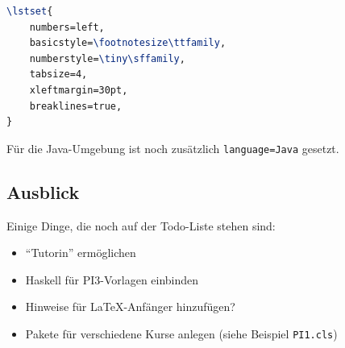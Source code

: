\documentclass[nicefonts,nogruppe,nosemester,noveranstaltung,notutor,noabgabe,utf]{uhb-inf-tex}
\begin{document}
\begin{lstlisting}[language=tex]
\lstset{
	numbers=left,
	basicstyle=\footnotesize\ttfamily,
	numberstyle=\tiny\sffamily,
	tabsize=4,
	xleftmargin=30pt,
	breaklines=true,
}
\end{lstlisting}

Für die Java-Umgebung ist noch zusätzlich \texttt{language=Java} gesetzt.

\subsection{Ausblick}

Einige Dinge, die noch auf der Todo-Liste stehen sind:

\begin{itemize}
	\item "`Tutorin"' ermöglichen
	\item Haskell für PI3-Vorlagen einbinden
	\item Hinweise für \LaTeX-Anfänger hinzufügen?
	\item Pakete für verschiedene Kurse anlegen (siehe Beispiel \texttt{PI1.cls})
\end{itemize}
\end{document}
